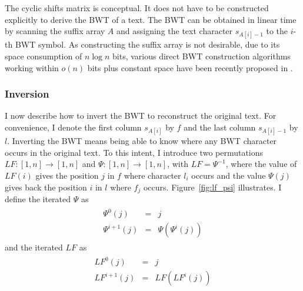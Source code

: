 The cyclic shifts matrix is conceptual.
It does not have to be constructed explicitly to derive the BWT of a text.
The BWT can be obtained in linear time by scanning the suffix array $A$ and assigning the text character $s_{A[i]-1}$ to the $i$-th BWT symbol.
As constructing the suffix array is not desirable, due to its space consumption of $n \log{n}$ bits, various direct BWT construction algorithms working within $o(n)$ bits plus constant space have been recently proposed in \citep{Bauer2013, Crochemore2013}.

\subsubsection{Inversion}

I now describe how to invert the BWT to reconstruct the original text.
For convenience, I denote the first column $s_{A[i]}$ by $f$ and the last column $s_{A[i] - 1}$ by $l$.
Inverting the BWT means being able to know where any BWT character occurs in the original text.
To this intent, I introduce two permutations $LF : [1,n] \rightarrow [1,n]$ and $\Psi : [1,n] \rightarrow [1,n]$, with $LF = \Psi^{-1}$, where the value of $LF(i)$ gives the position $j$ in $f$ where character $l_i$ occurs and the value $\Psi(j)$ gives back the position $i$ in $l$ where $f_j$ occurs.
Figure~\ref{fig:lf_psi} illustrates.
I define the iterated $\Psi$ as
\begin{eqnarray}
\begin{array}{lcl}
\Psi^0(j)     &=& j\\
\Psi^{i+1}(j) &=& \Psi(\Psi^{i}(j))
\end{array}
\end{eqnarray}
and the iterated $LF$ as
\begin{eqnarray}
\begin{array}{lcl}
LF^0(j)     &=& j\\
LF^{i+1}(j) &=& LF(LF^{i}(j))
\end{array}
\end{eqnarray}

